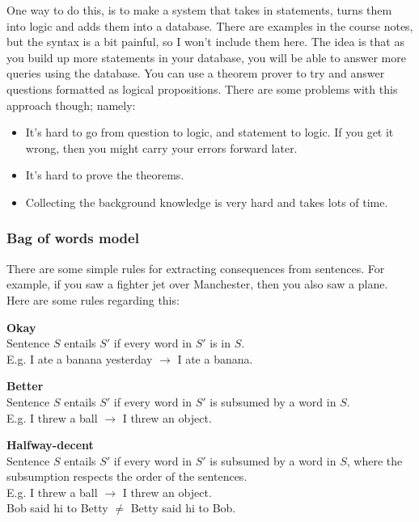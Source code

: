 One way to do this, is to make a system that takes in statements, turns them
into logic and adds them into a database. There are examples in the course
notes, but the syntax is a bit painful, so I won't include them here. The idea is
that as you build up more statements in your database, you will be able to
answer more queries using the database. You can use a theorem prover to try and
answer questions formatted as logical propositions. There are some problems with
this approach though; namely:

\begin{itemize}
  \item It's hard to go from question to logic, and statement to logic. If you get it 
    wrong, then you might carry your errors forward later.
  \item It's hard to prove the theorems.
  \item Collecting the background knowledge is very hard and takes lots of time.
\end{itemize}

\subsubsection{Bag of words model}

There are some simple rules for extracting consequences from sentences. For
example, if you saw a fighter jet over Manchester, then you also saw a plane.
Here are some rules regarding this:

\begin{description}
  \item \textbf{Okay}\\
    Sentence $S$ entails $S'$ if every word in $S'$ is in $S$.\\
    E.g. I ate a banana yesterday $\rightarrow$ I ate a banana.
  \item \textbf{Better}\\
    Sentence $S$ entails $S'$ if every word in $S'$ is subsumed by a word in
    $S$.\\
    E.g. I threw a ball $\rightarrow$ I threw an object.
  \item \textbf{Halfway-decent}\\
    Sentence $S$ entails $S'$ if every word in $S'$ is subsumed by a word in
    $S$, where the subsumption respects the order of the sentences.\\
    E.g. I threw a ball $\rightarrow$ I threw an object.\\
    Bob said hi to Betty $\neq$ Betty said hi to Bob.
\end{description}


